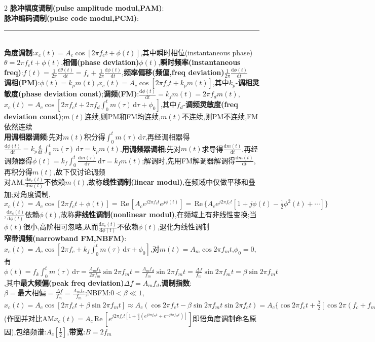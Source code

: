 \documentclass[UTF8,a4paper,10pt]{article}
\providecommand{\re}{\,\text{Re}\,}
\begin{document}
\begin{multicols}{2}
    \textbf{脉冲幅度调制(pulse amplitude modul,PAM)}:\\%
    \textbf{脉冲编码调制(pulse code modul,PCM)}:\\
    \rule{\columnwidth}{.5pt}\\
    \textbf{角度调制}:$x_c(t)=A_c\cos[2\pi f_ct+\phi(t)]$,其中瞬时相位(instantaneous phase)$\theta=2\pi f_ct+\phi(t)$,\textbf{相偏(phase deviation)}$\phi(t)$,\textbf{瞬时频率(instantaneous freq)}:$f(t)=\frac{1}{2\pi}\frac{\mathrm{d}\theta(t)}{\mathrm{d}t}=f_c+\frac{1}{2\pi}\frac{\mathrm{d}\phi(t)}{\mathrm{d}t}$,\textbf{频率偏移(频偏,freq deviation)}$\frac{1}{2\pi}\frac{\mathrm{d}\phi(t)}{\mathrm{d}t}$\\
    \textbf{调相(PM)}:$\phi(t)=k_pm(t)$,$x_c(t)=A_c\cos[2\pi f_ct+k_pm(t)]$,其中$k_p$-\textbf{调相灵敏度(phase deviation const)};\textbf{调频(FM)}:$\frac{\mathrm{d}\phi(t)}{\mathrm{d}t}=k_fm(t)=2\pi f_dm(t)$,$x_c(t)=A_c\cos[2\pi f_ct+2\pi f_d\int_0^tm(\tau)\,\mathrm{d}\tau+\phi_0]$,其中$f_d$-\textbf{调频灵敏度(freq deviation const)};$m(t)$连续,则PM和FM均连续,$m(t)$不连续,则PM不连续,FM依然连续\\
    \textbf{用调相器调频}:先对$m(t)$积分得$\int_0^tm(\tau)\,\mathrm{d}\tau$,再经调相器得$\frac{\mathrm{d}\phi(t)}{\mathrm{d}t}=k_p\frac{\mathrm{d}}{\mathrm{d}t}\int_0^tm(\tau)\,\mathrm{d}\tau=k_pm(t)$.\textbf{用调频器调相}:先对$m(t)$求导得$\frac{\mathrm{d}m(t)}{\mathrm{d}t}$,再经调频器得$\phi(t)=k_f\int_0^t\frac{\mathrm{d}m(\tau)}{\mathrm{d}\tau}\,\mathrm{d}\tau=k_fm(t)$;解调时,先用FM解调器解调得$\frac{\mathrm{d}m(t)}{\mathrm{d}t}$,再积分得$m(t)$,故下仅讨论调频\\
    对AM,$\frac{\mathrm{d}x_c(t)}{\mathrm{d}m(t)}$不依赖$m(t)$,故称\textbf{线性调制(linear modul)},在频域中仅做平移和叠加;对角度调制,$x_c(t)=A_c\cos[2\pi f_ct+\phi(t)]=\re[A_ce^{j2\pi f_ct}e^{j\phi(t)}]=\re\{A_ce^{j2\pi f_ct}[1+j\phi(t)-\frac{1}{2}\phi^2(t)+\cdots]\}$,$\frac{\mathrm{d}x_c(t)}{\mathrm{d}\phi(t)}$依赖$\phi(t)$,故称\textbf{非线性调制(nonlinear modul)},在频域上有非线性变换;当$\phi(t)$很小,高阶相可忽略,从而$\frac{\mathrm{d}x_c(t)}{\mathrm{d}\phi(t)}$不依赖$\phi(t)$,退化为线性调制\\
    \textbf{窄带调频(narrowband FM,NBFM)}:$x_c(t)=A_c\cos[2\pi f_c+k_f\int_0^tm(\tau)\,\mathrm{d}\tau+\phi_0]$,对$m(t)=A_m\cos 2\pi f_mt$,$\phi_0=0$,有$\phi(t)=f_k\int_0^tm(\tau)\,\mathrm{d}\tau=\frac{A_mf_k}{2\pi f_m}\sin 2\pi f_mt=\frac{A_mf_d}{f_m}\sin 2\pi f_mt=\frac{\Delta f}{f_m}\sin 2\pi f_mt=\beta\sin 2\pi f_mt$,其中\textbf{最大频偏(peak freq deviation)}$\Delta f=A_mf_d$,\textbf{调制指数}:$\beta=\text{最大相偏}=\frac{\Delta f}{f_m}=\frac{A_mf_d}{f_m}$;NBFM:$0<\beta\ll 1$,$x_c(t)=A_c\cos[2\pi f_ct+\beta\sin 2\pi f_mt]\approx A_c(\cos 2\pi f_ct-\beta\sin 2\pi f_mt\sin 2\pi f_ct)=A_c\{\cos 2\pi f_ct+\frac{\beta}{2}[\cos 2\pi(f_c+f_m)t-\cos 2\pi(f_c-f_m)t]\}=A_c\re[e^{j\pi f_ct}[1+\frac{\beta}{2}(e^{j2\pi f_mt}-e^{-j\pi f_mt})]]$(作图并对比AM$x_c(t)=A_c\re[e^{j2\pi f_ct[1+\frac{a}{2}(e^{j2\pi f_mt}+e^{-j2\pi f_mt})]}]$即悟角度调制命名原因),包络频谱:$A_c[\frac{1}{2}]$,\textbf{带宽}:$B=2f_m$\\%

\end{multicols}
\end{document}
